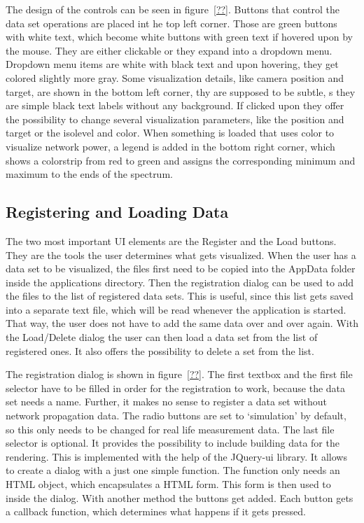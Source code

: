 The design of the controls can be seen in figure~\ref{??}. Buttons that control the data set operations are placed int he top left corner. Those are green buttons with white text, which become white buttons with green text if hovered upon by the mouse. They are either clickable or they expand into a dropdown menu. Dropdown menu items are white with black text and upon hovering, they get colored slightly more gray. Some visualization details, like camera position and target, are shown in the bottom left corner, thy are supposed to be subtle, s they are simple black text labels without any background. If clicked upon they offer the possibility to change several visualization parameters, like the position and target or the isolevel and color. When something is loaded that uses color to visualize network power, a legend is added in the bottom right corner, which shows a colorstrip from red to green and assigns the corresponding minimum and maximum to the ends of the spectrum.
\subsection{Registering and Loading Data}
The two most important UI elements are the Register and the Load buttons. They are the tools the user determines what gets visualized. When the user has a data set to be visualized, the files first need to be copied into the AppData folder inside the applications directory. Then the registration dialog can be used to add the files to the list of registered data sets. This is useful, since this list gets saved into a separate text file, which will be read whenever the application is started. That way, the user does not have to add the same data over and over again. With the Load/Delete dialog the user can then load a data set from the list of registered ones. It also offers the possibility to delete a set from the list. 

The registration dialog is shown in figure~\ref{??}. The first textbox and the first file selector have to be filled in order for the registration to work, because the data set needs a name. Further, it makes no sense to register a data set without network propagation data. The radio buttons  are set to `simulation' by default, so this only needs to be changed for real life measurement data. The last file selector is optional. It provides the possibility to include building data for the rendering. This is implemented with the help of the JQuery-ui library. It allows to create a dialog with a just one simple function. The function only needs an HTML object, which encapsulates a HTML form. This form is then used to inside the dialog. With another method the buttons get added. Each button gets a callback function, which determines what happens if it gets pressed. 

